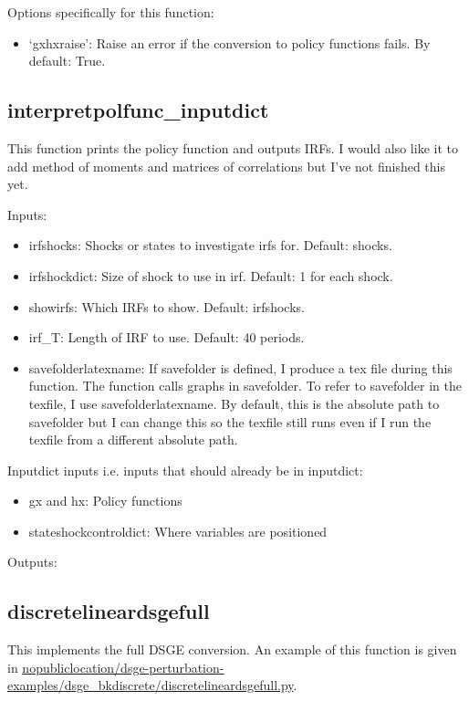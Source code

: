 \documentclass{article}
\theoremstyle{definition}
\begin{document}
Options specifically for this function:
\begin{itemize}
    \item `gxhxraise': Raise an error if the conversion to policy functions fails. By default: True.
\end{itemize}

\subsection{interpretpolfunc\_inputdict}
This function prints the policy function and outputs IRFs. I would also like it to add method of moments and matrices of correlations but I've not finished this yet.

Inputs:
\begin{itemize}
    \item irfshocks: Shocks or states to investigate irfs for. Default: shocks.
    \item irfshockdict: Size of shock to use in irf. Default: 1 for each shock.
    \item showirfs: Which IRFs to show. Default: irfshocks.
    \item irf\_T: Length of IRF to use. Default: 40 periods.
    \item savefolderlatexname: If savefolder is defined, I produce a tex file during this function. The function calls graphs in savefolder. To refer to savefolder in the texfile, I use savefolderlatexname. By default, this is the absolute path to savefolder but I can change this so the texfile still runs even if I run the texfile from a different absolute path.
\end{itemize}

Inputdict inputs i.e. inputs that should already be in inputdict:
\begin{itemize}
    \item gx and hx: Policy functions
    \item stateshockcontroldict: Where variables are positioned
\end{itemize}

Outputs:

\subsection{discretelineardsgefull}
This implements the full DSGE conversion. An example of this function is given in \url{nopubliclocation/dsge-perturbation-examples/dsge_bkdiscrete/discretelineardsgefull.py}. 
\end{document}
